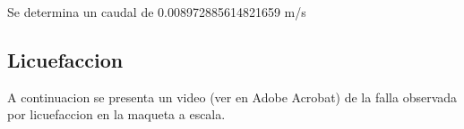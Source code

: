 Se determina un caudal de 0.008972885614821659 m/s

\subsection{Licuefaccion}

A continuacion se presenta un video (ver en Adobe Acrobat) de la falla observada por licuefaccion en la maqueta a escala.

\begin{center}
\end{center}


